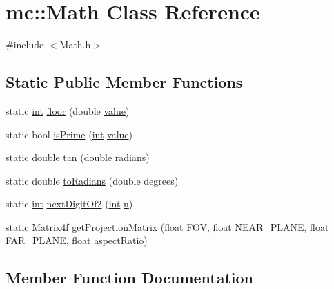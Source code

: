 \hypertarget{classmc_1_1_math}{}\section{mc\+:\+:Math Class Reference}
\label{classmc_1_1_math}


{\ttfamily \#include $<$Math.\+h$>$}

\subsection*{Static Public Member Functions}
\begin{DoxyCompactItemize}
\item 
static \hyperlink{_s_d_l__thread_8h_a6a64f9be4433e4de6e2f2f548cf3c08e}{int} \hyperlink{classmc_1_1_math_a761878b5c3df8f3c0a8fdd24fa76b371}{floor} (double \hyperlink{_s_d_l__opengl__glext_8h_a8ad81492d410ff2ac11f754f4042150f}{value})
\item 
static bool \hyperlink{classmc_1_1_math_a8259956dd9b5fbd727125205c8c992ba}{is\+Prime} (\hyperlink{_s_d_l__thread_8h_a6a64f9be4433e4de6e2f2f548cf3c08e}{int} \hyperlink{_s_d_l__opengl__glext_8h_a8ad81492d410ff2ac11f754f4042150f}{value})
\item 
static double \hyperlink{classmc_1_1_math_a07106fd3a808226b1ada3a5064296da2}{tan} (double radians)
\item 
static double \hyperlink{classmc_1_1_math_aabae3b51035367461fc3e0b1c528d56d}{to\+Radians} (double degrees)
\item 
static \hyperlink{_s_d_l__thread_8h_a6a64f9be4433e4de6e2f2f548cf3c08e}{int} \hyperlink{classmc_1_1_math_a1c1ff42463d211c0714ff390a9a34db3}{next\+Digit\+Of2} (\hyperlink{_s_d_l__thread_8h_a6a64f9be4433e4de6e2f2f548cf3c08e}{int} \hyperlink{_s_d_l__opengl__glext_8h_ae2b4646468bc89d0ba646f5cf838e051}{n})
\item 
static \hyperlink{namespacemc_afd32b9ea49ccd962bb337dc71450595b}{Matrix4f} \hyperlink{classmc_1_1_math_a399c5c15df979f3f0c38464fc2e12306}{get\+Projection\+Matrix} (float F\+OV, float N\+E\+A\+R\+\_\+\+P\+L\+A\+NE, float F\+A\+R\+\_\+\+P\+L\+A\+NE, float aspect\+Ratio)
\end{DoxyCompactItemize}


\subsection{Member Function Documentation}
